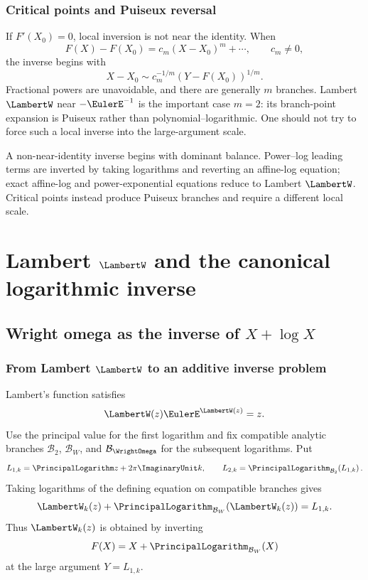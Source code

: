 \documentclass[11pt,oneside]{book}
\theoremstyle{definition}
\theoremstyle{remark}
\newcommand{\LogarithmOnBranch}[2]{%
  \PrincipalLogarithm_{#1}\!\left(#2\right)%
}
\begin{document}
\section{Critical points and Puiseux reversal}
If $F'(X_0)=0$, local inversion is not near the identity.  When
\[
 F(X)-F(X_0)=c_m(X-X_0)^m+\cdots,
 \qquad c_m\ne0,
\]
the inverse begins with
\[
 X-X_0\sim c_m^{-1/m}(Y-F(X_0))^{1/m}.
\]
Fractional powers are unavoidable, and there are generally $m$ branches.
Lambert $\LambertW$ near $-\EulerE^{-1}$ is the important case $m=2$: its branch-point
expansion is Puiseux rather than polynomial--logarithmic.  One should not try
to force such a local inverse into the large-argument scale.

\begin{summarybox}
A non-near-identity inverse begins with dominant balance.  Power--log leading
terms are inverted by taking logarithms and reverting an affine-log equation;
exact affine-log and power-exponential equations reduce to Lambert $\LambertW$.
Critical points instead produce Puiseux branches and require a different
local scale.
\end{summarybox}

\part{Lambert \texorpdfstring{$\LambertW$}{W} and the canonical logarithmic inverse}
\label{part:lambert}

\chapter{Wright omega as the inverse of \texorpdfstring{$X+\log X$}{X+log X}}
\label{ch:lambert-omega}

\section{From Lambert \texorpdfstring{$\LambertW$}{W} to an additive inverse problem}
Lambert's function satisfies
\[
 \LambertW(z)\EulerE^{\LambertW(z)}=z.
\]
Use the principal value for the first logarithm and fix compatible analytic
branches $\mathcal B_2$, $\mathcal B_W$, and $\mathcal B_\WrightOmega$ for the
subsequent logarithms.  Put
\begin{equation}\label{eq:L1-L2-def}
 L_{1,k}=\PrincipalLogarithm z+2\pi\ImaginaryUnit k,
 \qquad
 L_{2,k}=\LogarithmOnBranch{\mathcal B_2}{L_{1,k}}.
\end{equation}
Taking logarithms of the defining equation on compatible branches gives
\begin{equation}\label{eq:W-additive-equation}
 \LambertW_k(z)+\LogarithmOnBranch{\mathcal B_W}{\LambertW_k(z)}=L_{1,k}.
\end{equation}
Thus $\LambertW_k(z)$ is obtained by inverting
\[
 F(X)=X+\LogarithmOnBranch{\mathcal B_W}{X}
\]
at the large argument $Y=L_{1,k}$.
\end{document}
